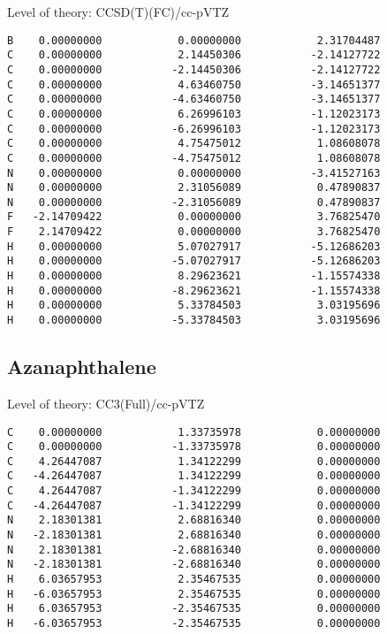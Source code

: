 \documentclass[journal=jctcce,manuscript=article,layout=traditional]{achemso}
\newcommand{\TZ}{cc-pVTZ}
\begin{document}
\begin{singlespace}
Level of theory: CCSD(T)(FC)/{\TZ}
\begin{verbatim}
B    0.00000000            0.00000000            2.31704487
C    0.00000000            2.14450306           -2.14127722
C    0.00000000           -2.14450306           -2.14127722
C    0.00000000            4.63460750           -3.14651377
C    0.00000000           -4.63460750           -3.14651377
C    0.00000000            6.26996103           -1.12023173
C    0.00000000           -6.26996103           -1.12023173
C    0.00000000            4.75475012            1.08608078
C    0.00000000           -4.75475012            1.08608078
N    0.00000000            0.00000000           -3.41527163
N    0.00000000            2.31056089            0.47890837
N    0.00000000           -2.31056089            0.47890837
F   -2.14709422            0.00000000            3.76825470
F    2.14709422            0.00000000            3.76825470
H    0.00000000            5.07027917           -5.12686203
H    0.00000000           -5.07027917           -5.12686203
H    0.00000000            8.29623621           -1.15574338
H    0.00000000           -8.29623621           -1.15574338
H    0.00000000            5.33784503            3.03195696
H    0.00000000           -5.33784503            3.03195696
\end{verbatim}
\end{singlespace}

\subsection*{Azanaphthalene}

\begin{singlespace}
Level of theory: CC3(Full)/{\TZ}
\begin{verbatim}
C    0.00000000            1.33735978            0.00000000
C    0.00000000           -1.33735978            0.00000000
C    4.26447087            1.34122299            0.00000000
C   -4.26447087            1.34122299            0.00000000
C    4.26447087           -1.34122299            0.00000000
C   -4.26447087           -1.34122299            0.00000000
N    2.18301381            2.68816340            0.00000000
N   -2.18301381            2.68816340            0.00000000
N    2.18301381           -2.68816340            0.00000000
N   -2.18301381           -2.68816340            0.00000000
H    6.03657953            2.35467535            0.00000000
H   -6.03657953            2.35467535            0.00000000
H    6.03657953           -2.35467535            0.00000000
H   -6.03657953           -2.35467535            0.00000000
\end{verbatim}
\end{singlespace}
\end{document}
